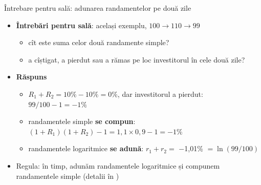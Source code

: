 \begin{frame}{Întrebare pentru sală: adunarea randamentelor pe două zile}
\itemsize{\footnotesize}
\begin{itemize}
    \item \textbf{Întrebări pentru sală}: același exemplu, $100 \to 110 \to 99$
    \begin{itemize}
        \item cît este suma celor două randamente simple?
        \item a cîștigat, a pierdut sau a rămas pe loc investitorul în cele două zile?
    \end{itemize}
    \pause
    \item \textbf{Răspuns}
    \begin{itemize}
        \item $R_1 + R_2 = 10\% - 10\% = 0\%$, dar investitorul a pierdut: $99/100 - 1 = -1\%$
        \item randamentele simple \textbf{se compun}: $(1 + R_1)(1 + R_2) - 1 = 1{,}1 \times 0{,}9 - 1 = -1\%$
        \item randamentele logaritmice \textbf{se adună}: $r_1 + r_2 = $ \ensuremath{-}1{,}01\% $= \ln(99/100)$
    \end{itemize}
    \item Regula: în timp, adunăm randamentele logaritmice și compunem randamentele simple (detalii în )
\end{itemize}
\end{frame}


